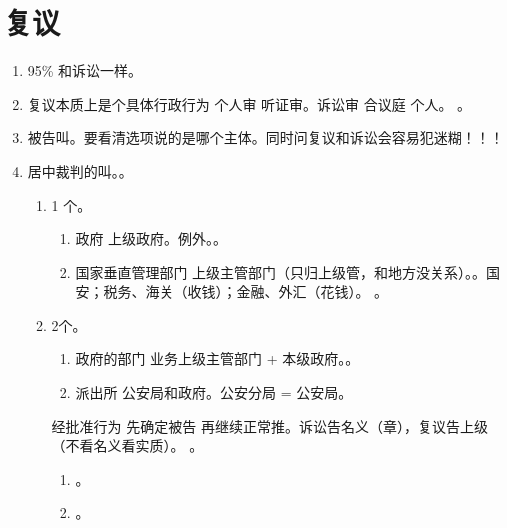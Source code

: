 \section{复议}
\begin{enumerate}
  \item 95\% 和诉讼一样。
  \item 复议本质上是个具体行政行为  个人审 \yjt 听证审。诉讼审 \yjt 合议庭  个人。
        。
  \item 被告叫。要看清选项说的是哪个主体。同时问复议和诉讼会容易犯迷糊！！！
  \item 居中裁判的叫。。
        \begin{enumerate}
          \item 1 个。
                \begin{enumerate}
                  \item 政府 \yjt 上级政府。例外。。
                  \item 国家垂直管理部门 \yjt 上级主管部门（只归上级管，和地方没关系）。。国安；税务、海关（收钱）；金融、外汇（花钱）。
                        。
                \end{enumerate}
          \item 2个。
                \begin{enumerate}
                  \item 政府的部门 \yjt 业务上级主管部门 + 本级政府。。
                  \item 派出所 \yjt 公安局和政府。公安分局 = 公安局。
                \end{enumerate}
                \begin{kk}{经批准行为}
                  先确定被告 \yjt 再继续正常推。诉讼告名义（章），复议告上级（不看名义看实质）。
                  。
                  \begin{enumerate}
                    \item {}。
                    \item {}。
                  \end{enumerate}
                \end{kk}

\end{enumerate}
\end{enumerate}
